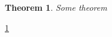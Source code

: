 \documentclass{article}
\newtheorem{thm}{Theorem}
\begin{document}
\begin{thm}\label{foo}
Some theorem
\end{thm}
\cref{foo}
\end{document}

